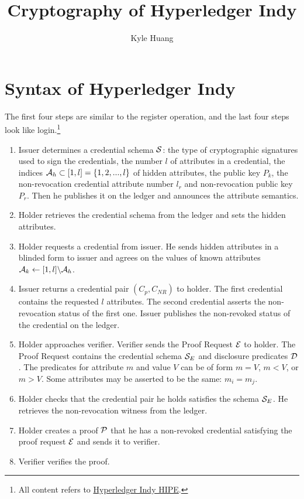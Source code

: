\documentclass{article}
\begin{document}
\title{Cryptography of Hyperledger Indy}
\author{Kyle Huang}
\maketitle

\section{Syntax of Hyperledger Indy}
The first four steps are similar to the register operation, and the last four steps look like login.\footnote{All content refers to \href{https://hyperledger-indy.readthedocs.io/projects/hipe/en/latest/text/0109-anoncreds-protocol/README.html}{Hyperledger Indy HIPE}.}
\begin{enumerate}
\item Issuer determines a credential schema $\mathcal{S}$: the type of cryptographic signatures used to sign the credentials, the number $l$ of attributes in a credential, the indices $\mathcal{A}_{h} \subset [1, l] = \{1, 2, ..., l\}$ of hidden attributes, the public key $P_{k}$, the non-revocation credential attribute number $l_{r}$ and non-revocation public key $P_{r}$. Then he publishes it on the ledger and announces the attribute semantics.
\item Holder retrieves the credential schema from the ledger and sets the hidden attributes.
\item Holder requests a credential from issuer. He sends hidden attributes in a blinded form to issuer and agrees on the values of known attributes $\mathcal{A}_{k} \leftarrow [1, l] \backslash \mathcal{A}_{h} $.
\item Issuer returns a credential pair $(C_{p}, C_{NR})$ to holder. The first credential contains the requested $l$ attributes. The second credential asserts the non-revocation status of the first one. Issuer publishes the non-revoked status of the credential on the ledger.
\item Holder approaches verifier. Verifier sends the Proof Request $\mathcal{E}$ to holder. The Proof Request contains the credential schema $\mathcal{S}_{E}$ and disclosure predicates $\mathcal{D}$. The predicates for attribute $m$ and value $V$ can be of form $m=V$, $m<V$, or $m>V$. Some attributes may be asserted to be the same: $m_{i}=m_{j}$.
\item Holder checks that the credential pair he holds satisfies the schema $\mathcal{S}_{E}$. He retrieves the non-revocation witness from the ledger.
\item Holder creates a proof $\mathcal{P}$ that he has a non-revoked credential satisfying the proof request $\mathcal{E}$ and sends it to verifier.
\item Verifier verifies the proof.
\end{enumerate}
\end{document}
